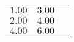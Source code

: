 \begin{table}[ht]
	\begin{center}
	\label{tab:test}
		\begin{tabular}{lcr}
		\toprule
			$1.00$ & $3.00$\\
			$2.00$ & $4.00$\\
			$4.00$ & $6.00$\\
		\bottomrule
		\end{tabular}
	\end{center}
\end{table}
